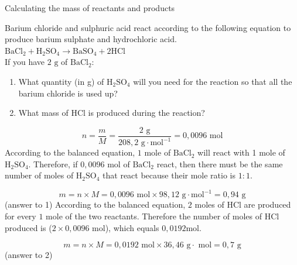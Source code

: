       \begin{wex}{ Calculating the mass of reactants and products }
{
      \label{m38717*id279063}Barium chloride and sulphuric acid react according to the following equation to produce barium sulphate and hydrochloric acid.\\
      \label{m38717*id279070}
        ${\text{BaCl}}_{2}+{\text{H}}_{2}{\text{SO}}_{4}\to {\text{BaSO}}_{4}+2\text{HCl}$
      \\
      \label{m38717*id279141}If you have $2 \text{ g}$ of $\text{BaCl}{}_{2}$:
      \label{m38717*id279158}\begin{enumerate}[noitemsep, label=\textbf{\arabic*}. ] 
\item What quantity (in g) of $\text{H}{}_{2}\text{SO}{}_{4}$ will you need for the reaction so that all the barium chloride is used up?
\item What mass of $\text{HCl}$ is produced during the reaction?
\end{enumerate}     
}
{
        
    \begin{equation*}
    n=\frac{m}{M}=\frac{2 \text{ g}}{208,2 \text{ g} \cdot \text{mol}^{-1}}=0,0096 \text{ mol}
      \end{equation*}
      \label{m38717*id279344}According to the balanced equation, $1$ mole of $\text{BaCl}{}_{2}$ will react with 1 mole of $\text{H}{}_{2}\text{SO}{}_{4}$. Therefore, if $0,0096 \text{ mol}$ of $\text{BaCl}{}_{2}$ react, then there must be the same number of moles of $\text{H}{}_{2}\text{SO}{}_{4}$ that react because their mole ratio is $1:1$.
      \label{m38717*id279456}\nopagebreak\noindent{}
        
    \begin{equation*}
    m=n \times M = 0,0096 \text{ mol} \times 98,12 \text{ g} \cdot \text{mol}^{-1} = 0,94 \text{ g}
      \end{equation*}
      \label{m38717*id279505}(answer to 1) 
      \label{m38717*id279513}According to the balanced equation, $2$ moles of $\text{HCl}$ are produced for every $1$ mole of the two reactants. Therefore the number of moles of $\text{HCl}$ produced is ($2 \times 0,0096 \text{ mol}$), which equals $0,0192 \text{mol}$.
      \label{m38717*id279531}\nopagebreak\noindent{}
        
    \begin{equation*}
    m=n \times M = 0,0192 \text{ mol} \times 36,46 \text{ g} \cdot \text{ mol} = 0,7 \text{ g}
      \end{equation*}
      \label{m38717*id279580}(answer to 2) 
}
    \end{wex}
    \noindent

